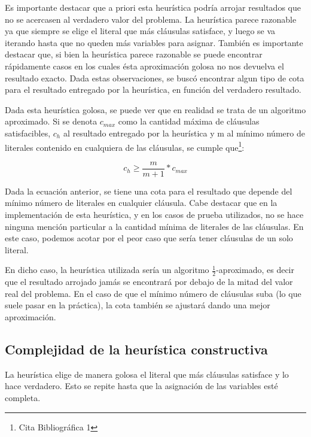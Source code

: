\documentclass[a4paper,10pt]{article}
\begin{document}
Es importante destacar que a priori esta heur\'istica podr\'ia arrojar resultados que no se acercasen al verdadero valor del problema. La heur\'istica parece razonable ya que siempre se elige el literal que m\'as cl\'ausulas satisface, y luego se va iterando hasta que no queden m\'as variables para asignar. Tambi\'en es importante destacar que, si bien la heur\'istica parece razonable se puede encontrar r\'apidamente casos en los cuales \'esta aproximaci\'on golosa no nos devuelva el resultado exacto. Dada estas observaciones, se busc\'o encontrar algun tipo de cota para el resultado entregado por la heur\'istica, en funci\'on del verdadero resultado.

Dada esta heur\'istica golosa, se puede ver que en realidad se trata de un algoritmo aproximado. Si se denota $c_{max}$ como la cantidad m\'axima de cl\'ausulas satisfacibles, $c_h$ al resultado entregado por la heur\'istica y m al m\'inimo n\'umero de literales contenido en cualquiera de las cl\'ausulas, se cumple que\footnote{Cita Bibliogr\'afica 1}:


\begin{equation}
c_h \geq \frac{m}{m+1}*c_{max}
\end{equation}

Dada la ecuaci\'on anterior, se tiene una cota para el resultado que depende del m\'inimo n\'umero de literales en cualquier cl\'ausula. Cabe destacar que en la implementaci\'on de esta heur\'istica, y en los casos de prueba utilizados, no se hace ninguna menci\'on particular a la cantidad m\'inima de literales de las cl\'ausulas. En este caso, podemos acotar por el peor caso que ser\'ia tener cl\'ausulas de un solo literal.

En dicho caso, la heur\'istica utilizada ser\'ia un algoritmo $\frac{1}{2}$-aproximado, es decir que el resultado arrojado jam\'as se encontrar\'a por debajo de la mitad del valor real del problema. En el caso de que el m\'inimo n\'umero de cl\'ausulas suba (lo que suele pasar en la pr\'actica), la cota tambi\'en se ajustar\'a dando una mejor aproximaci\'on.

\subsection*{Complejidad de la heur\'istica constructiva}

La heurística elige de manera golosa el literal que más cl\'ausulas satisface y lo hace verdadero. Esto se repite hasta que la asignación de las variables esté completa.
\end{document}
